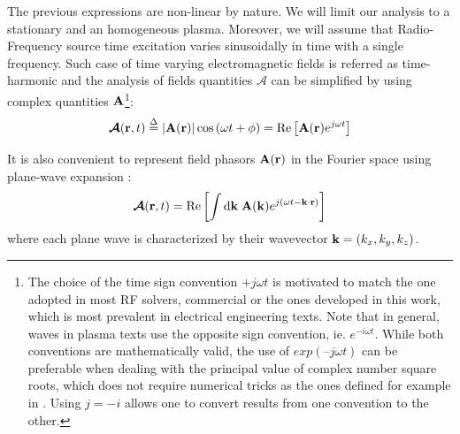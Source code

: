 The previous expressions are non-linear by nature. We will limit our analysis to a stationary and an homogeneous plasma. Moreover, we will assume that Radio-Frequency source time excitation varies sinusoidally in time with a single frequency. Such case of time varying electromagnetic fields is referred as time-harmonic   and the analysis of fields quantities $\boldsymbol{\mathcal{A}}$ can be simplified by using complex quantities ${\mathbf A}$\footnote{The choice of the time sign convention $+j\omega t$ is motivated to match the one adopted in most RF solvers, commercial or the ones developed in this work, which is most prevalent in electrical engineering texts. Note that in general, waves in plasma texts use the opposite sign convention, ie. $e^{-i\omega t}$\cite{bradley2007, michelsen2019}. While both conventions are mathematically valid, the use of $exp(–j\omega t)$ can be preferable when dealing with the principal value of complex number square roots, which does not require numerical tricks as the ones defined for example in \cite{Hillairet2007a}. Using $j=-i$ allows one to convert results from one convention to the other.}:
\begin{equation}
\boldsymbol{\mathcal{A}}({\mathbf r},t) 
	\stackrel{\Delta}{=} 
	\left| {\mathbf A}({\mathbf r}) \right| \cos\left(\omega t + \phi \right) 
	= 
	\Re \left[ {\mathbf A}({\mathbf r}) e^{j\omega t} \right]
\end{equation}

It is also convenient to represent field phasors ${\mathbf A}(\mathbf{r})$ in the Fourier space using plane-wave expansion : 
\begin{equation}
		\boldsymbol{\mathcal{A}}(\mathbf{r}, t) 
		=
		\Re \left[
		\int {\mathrm{d}} {\mathbf k} \;
		\mathbf{A}({\mathbf k}) e^{j(\omega t - {\mathbf k}\cdot{\mathbf r})}
		\right]
	\label{eq:k-spectralDefinition}
\end{equation}
where each plane wave is characterized by their wavevector ${\mathbf k}=(k_x, k_y, k_z)$. 

